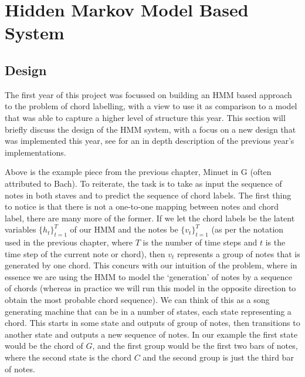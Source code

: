 \documentclass[bsc,singlespacing,logo, parskip, deptreport]{infthesis}
\begin{document}
\section{Hidden Markov Model Based System} \label{HMM}
\subsection{Design} \label{HMM DES}

The first year of this project was focussed on building an HMM based approach to the problem of chord labelling, with a view to use it as comparison to a model that was able to capture a higher level of structure this year. This section will briefly discuss the design of the HMM system, with a focus on a new design that was implemented this year, see \cite{mcafee} for an in depth description of the previous year's implementations.

\begin{center}
\end{center}

Above is the example piece from the previous chapter, Minuet in G (often attributed to Bach). To reiterate, the task is to take as input the sequence of notes in both staves and to predict the sequence of chord labels. The first thing to notice is that there is not a one-to-one mapping between notes and chord label, there are many more of the former. If we let the chord labels be the latent variables $\{h_t\}_{t=1}^{T}$ of our HMM and the notes be $\{v_t\}_{t=1}^{T}$ (as per the notation used in the previous chapter, where $T$ is the number of time steps and $t$ is the time step of the current note or chord), then $v_t$ represents a group of notes that is generated by one chord. This concurs with our intuition of the problem, where in essence we are using the HMM to model the `generation' of notes by a sequence of chords (whereas in practice we will run this model in the opposite direction to obtain the most probable chord sequence). We can think of this as a song generating machine that can be in a number of states, each state representing a chord. This starts in some state and outputs of group of notes, then transitions to another state and outputs a new sequence of notes. In our example the first state would be the chord of $G$, and the first group would be the first two bars of notes, where the second state is the chord $C$ and the second group is just the third bar of notes.
\end{document}
